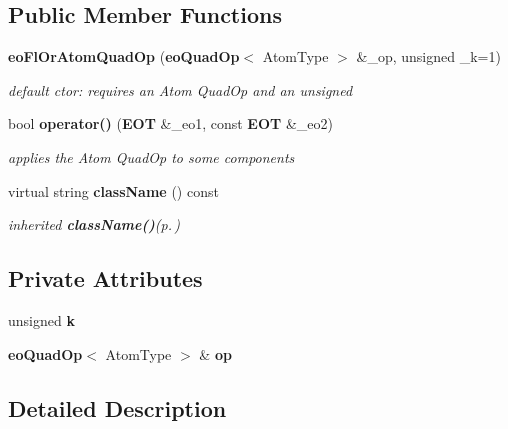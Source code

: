 \subsection*{Public Member Functions}
\begin{CompactItemize}
\item 
{\bf eo\-Fl\-Or\-Atom\-Quad\-Op} ({\bf eo\-Quad\-Op}$<$ Atom\-Type $>$ \&\_\-op, unsigned \_\-k=1)\label{classeo_fl_or_k_atom_quad_op_a0}

\begin{CompactList}\small\item\em default ctor: requires an Atom Quad\-Op and an unsigned \item\end{CompactList}\item 
bool {\bf operator()} ({\bf EOT} \&\_\-eo1, const {\bf EOT} \&\_\-eo2)\label{classeo_fl_or_k_atom_quad_op_a1}

\begin{CompactList}\small\item\em applies the Atom Quad\-Op to some components \item\end{CompactList}\item 
virtual string {\bf class\-Name} () const \label{classeo_fl_or_k_atom_quad_op_a2}

\begin{CompactList}\small\item\em inherited {\bf class\-Name()}{\rm (p.\,\pageref{classeo_fl_or_k_atom_quad_op_a2})} \item\end{CompactList}\end{CompactItemize}
\subsection*{Private Attributes}
\begin{CompactItemize}
\item 
unsigned {\bf k}\label{classeo_fl_or_k_atom_quad_op_r0}

\item 
{\bf eo\-Quad\-Op}$<$ Atom\-Type $>$ \& {\bf op}\label{classeo_fl_or_k_atom_quad_op_r1}

\end{CompactItemize}


\subsection{Detailed Description}
